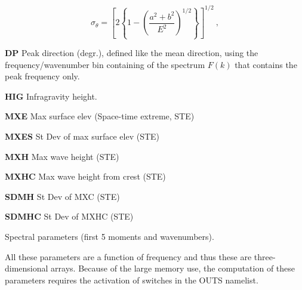 \begin{list}{)\hfill}
\begin{list}{)\hfill}
      \begin{equation} \sigma_\theta = \left [ 2 \left \{ 1 - \left (
      \frac{a^2+b^2}{E^2} \right )^{1/2} \right \} \right ]^{1/2}
      \: , \label{eq:sig_th} \end{equation}
\item \textbf{DP} Peak direction (degr.), defined like the mean direction, using the
      frequency/wavenumber bin containing of the spectrum $F(k)$ that
      contains the peak frequency only.
\item \textbf{HIG} Infragravity height.
\item \textbf{MXE}   Max surface elev (Space-time extreme, STE)
\item \textbf{MXES}  St Dev of max surface elev (STE)
\item \textbf{MXH}  Max wave height (STE)
\item \textbf{MXHC}  Max wave height from crest (STE)
\item \textbf{SDMH}  St Dev of MXC (STE)
\item \textbf{SDMHC} St Dev of MXHC (STE)
\end{list}

\item{Spectral parameters (first 5 moments and wavenumbers). 

All these parameters are a function 
of frequency and thus these are three-dimensional arrays. Because of the large memory use, the 
computation of these parameters requires the activation of switches in the {\F OUTS} namelist.}

\begin{list}{)\hfill}
            { \leftmargin 8mm 
             \rightmargin 0mm \itemsep 0mm \parsep 0mm}
   

\end{list}
\end{list}
